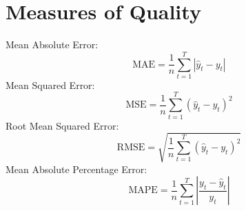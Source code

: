 \section{Measures of Quality}
\label{app:measures_of_quality}
\noindent Mean Absolute Error: $$\text{MAE} = \frac{1}{n}\sum\limits_{t=1}^T |\hat{y}_t - y_t|$$
\noindent Mean Squared Error: $$\text{MSE} = \frac{1}{n} \sum\limits_{t=1}^T \left(\hat{y}_t - y_t\right)^2$$
\noindnet Root Mean Squared Error: $$\text{RMSE} = \sqrt{\frac{1}{n}\sum\limits_{t=1}^T \left(\hat{y}_t - y_t\right)^2}$$
\noindent Mean Absolute Percentage Error: $$\text{MAPE} = \frac{1}{n}\sum\limits_{t=1}^T \left|\frac{y_t - \hat{y}_t}{y_t}\right|$$
